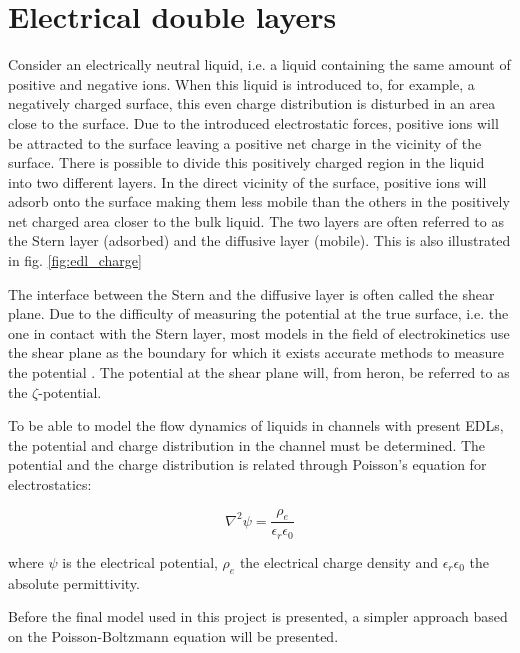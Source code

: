 \section{Electrical double layers}
Consider an electrically neutral liquid, i.e. a liquid containing the
same amount of positive and negative ions. When this liquid is
introduced to, for example, a negatively charged surface, this even
charge distribution is disturbed in an area close to the surface. Due
to the introduced electrostatic forces, positive ions will be
attracted to the surface leaving a positive net charge in the vicinity
of the surface. There is possible to divide this positively charged
region in the liquid into two different layers. In the direct vicinity
of the surface, positive ions will adsorb onto the surface making them
less mobile than the others in the positively net charged area closer
to the bulk liquid. The two layers are often referred to as the Stern
layer (adsorbed) and the diffusive layer (mobile). This is also
illustrated in fig. \ref{fig:edl_charge} \cite{ren_book}

The interface between the Stern and the diffusive layer is often
called the shear plane. Due to the difficulty of measuring the
potential at the true surface, i.e. the one in contact with the Stern
layer, most models in the field of electrokinetics use the shear plane
as the boundary for which it exists accurate methods to measure the
potential \cite{ren_book}. The potential at the shear plane will,
from heron, be referred to as the $\zeta$-potential. 

To be able to model the flow dynamics of liquids in channels with
present EDLs, the potential and charge distribution in the channel
must be determined. The potential and the charge distribution is
related through Poisson's equation for electrostatics:

\begin{equation}
\nabla^2\psi = \frac{\rho_e}{\epsilon_r \epsilon_0}
\end{equation}

where $\psi$ is the electrical potential, $\rho_e$ the electrical
charge density and $\epsilon_r \epsilon_0$ the absolute permittivity. 

Before the final model used in this project is
presented, a simpler approach based on the Poisson-Boltzmann equation
will be presented. 




